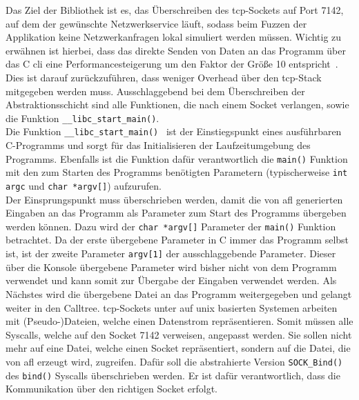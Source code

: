 Das Ziel der Bibliothek ist es, das Überschreiben des \gls{tcp}-Sockets auf Port 7142, auf dem der gewünschte Netzwerkservice
läuft, sodass beim Fuzzen der Applikation keine Netzwerkanfragen lokal simuliert werden müssen.
Wichtig zu erwähnen ist hierbei, dass das direkte Senden von Daten an das Programm über das C \gls{cli} eine Performancesteigerung
um den Faktor der Größe 10 entspricht~\cite{afl-best-practice}.
Dies ist darauf zurückzuführen, dass weniger Overhead über den \gls{tcp}-Stack mitgegeben werden muss.
Ausschlaggebend bei dem Überschreiben der Abstraktionsschicht sind alle Funktionen, die nach einem Socket verlangen, sowie
die Funktion \texttt{\_\_libc\_start\_main()}.\\
Die Funktion \texttt{\_\_libc\_start\_main()}~\cite{libc-start-main} ist der Einstiegspunkt eines ausführbaren C-Programms und sorgt für das Initialisieren
der Laufzeitumgebung des Programms.
Ebenfalls ist die Funktion dafür verantwortlich die \texttt{main()} Funktion mit den zum Starten des Programms benötigten
Parametern (typischerweise \texttt{int argc} und \texttt{char *argv[]}) aufzurufen.\\
Der Einsprungspunkt muss überschrieben werden, damit die von \gls{afl} generierten Eingaben an das Programm als
Parameter zum Start des Programms übergeben werden können.
Dazu wird der \texttt{char *argv[]} Parameter der \texttt{main()} Funktion betrachtet.
Da der erste übergebene Parameter in C immer das Programm selbst ist, ist der zweite Parameter \texttt{argv[1]} der ausschlaggebende
Parameter.
Dieser über die Konsole übergebene Parameter wird bisher nicht von dem Programm verwendet und kann somit zur Übergabe der
Eingaben verwendet werden.
Als Nächstes wird die übergebene Datei an das Programm weitergegeben und gelangt weiter in den Calltree.
\gls{tcp}-Sockets unter auf \gls{unix} basierten Systemen arbeiten mit (Pseudo-)Dateien, welche einen Datenstrom repräsentieren.
Somit müssen alle Syscalls, welche auf den Socket 7142 verweisen, angepasst werden.
Sie sollen nicht mehr auf eine Datei, welche einen Socket repräsentiert, sondern auf die Datei, die von \gls{afl}
erzeugt wird, zugreifen.
Dafür soll die abstrahierte Version \texttt{SOCK\_Bind()} des \texttt{bind()} Syscalls überschrieben werden.
Er ist dafür verantwortlich, dass die Kommunikation über den richtigen Socket erfolgt.
